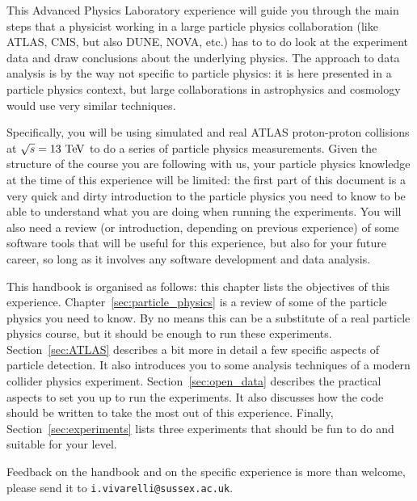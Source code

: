 
This Advanced Physics Laboratory experience will guide you through the main steps that a physicist working in a large particle physics collaboration (like ATLAS, CMS, but also DUNE, NOVA, etc.) has to to do look at the experiment data and draw conclusions about the underlying physics. The approach to data analysis is by the way not specific to particle physics: it is here presented in a particle physics context, but large collaborations in astrophysics and cosmology would use very similar techniques.

 Specifically, you will be using simulated and real ATLAS proton-proton collisions at $\sqrt{s} = 13\ \TeV$ to do a series of particle physics measurements. Given the structure of the course you are following with us, your particle physics knowledge at the time of this experience will be limited: the first part of this document is a very quick and dirty introduction to the particle physics you need to know to be able to understand what you are doing when running the experiments. You will also need a review (or introduction, depending on previous experience) of some software tools that will be useful for this experience, but also for your future career, so long as it involves any software development and data analysis. 

This handbook is organised as follows: this chapter lists the objectives of this experience. Chapter~\ref{sec:particle_physics} is a review of some of the particle physics you need to know. By no means this can be a substitute of a real particle physics course, but it should be enough to run these experiments. Section~\ref{sec:ATLAS} describes a bit more in detail a few specific aspects of particle detection. It also introduces you to some analysis techniques of a modern collider physics experiment. Section~\ref{sec:open_data} describes the practical aspects to set you up to run the experiments. It also discusses how the code should be written to take the most out of this experience. Finally, Section~\ref{sec:experiments} lists three experiments that should be fun to do and suitable for your level. 

Feedback on the handbook and on the specific experience is more than welcome, please send it to \verb|i.vivarelli@sussex.ac.uk|. 